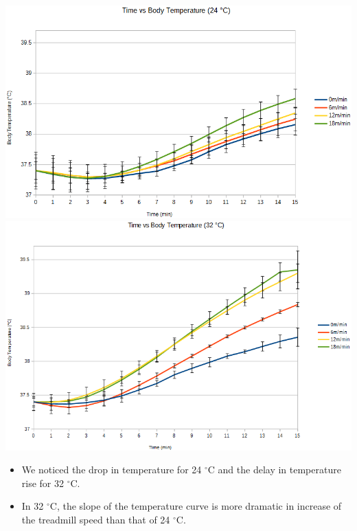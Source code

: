 \documentclass[landscape,paperwidth=42in,paperheight=52in,fontscale=0.27]{baposter} %
\newcommand{\compresslist}{ %
\setlength{\itemsep}{1pt}
\setlength{\parskip}{0pt}
\setlength{\parsep}{0pt}
}
\begin{document}
\begin{poster}
{\begin{center}
\includegraphics[width=.513\linewidth]{24deg.png}
\includegraphics[width=.475\linewidth]{32deg.png}
\end{center}
\begin{itemize}\compresslist
\item We noticed the drop in temperature for 24 $^{\circ}$C and the delay in temperature rise for 32 $^{\circ}$C.
\item In 32 $^{\circ}$C, the slope of the temperature curve is more dramatic in increase of the treadmill speed than that of 24 $^{\circ}$C.
\end{itemize}
}



\end{poster}
\end{document}

